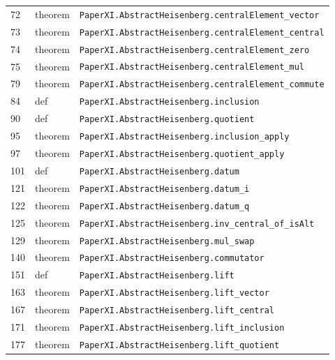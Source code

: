 \documentclass[10pt,oneside]{book}
\begin{document}
\begin{longtable}{@{}p{}p{}p{}@{}}
72&theorem&\nolinkurl{PaperXI.AbstractHeisenberg.centralElement_vector}\\

73&theorem&\nolinkurl{PaperXI.AbstractHeisenberg.centralElement_central}\\

74&theorem&\nolinkurl{PaperXI.AbstractHeisenberg.centralElement_zero}\\

75&theorem&\nolinkurl{PaperXI.AbstractHeisenberg.centralElement_mul}\\

79&theorem&\nolinkurl{PaperXI.AbstractHeisenberg.centralElement_commute}\\

84&def&\nolinkurl{PaperXI.AbstractHeisenberg.inclusion}\\

90&def&\nolinkurl{PaperXI.AbstractHeisenberg.quotient}\\

95&theorem&\nolinkurl{PaperXI.AbstractHeisenberg.inclusion_apply}\\

97&theorem&\nolinkurl{PaperXI.AbstractHeisenberg.quotient_apply}\\

101&def&\nolinkurl{PaperXI.AbstractHeisenberg.datum}\\

121&theorem&\nolinkurl{PaperXI.AbstractHeisenberg.datum_i}\\

122&theorem&\nolinkurl{PaperXI.AbstractHeisenberg.datum_q}\\

125&theorem&\nolinkurl{PaperXI.AbstractHeisenberg.inv_central_of_isAlt}\\

129&theorem&\nolinkurl{PaperXI.AbstractHeisenberg.mul_swap}\\

140&theorem&\nolinkurl{PaperXI.AbstractHeisenberg.commutator}\\

151&def&\nolinkurl{PaperXI.AbstractHeisenberg.lift}\\

163&theorem&\nolinkurl{PaperXI.AbstractHeisenberg.lift_vector}\\

167&theorem&\nolinkurl{PaperXI.AbstractHeisenberg.lift_central}\\

171&theorem&\nolinkurl{PaperXI.AbstractHeisenberg.lift_inclusion}\\

177&theorem&\nolinkurl{PaperXI.AbstractHeisenberg.lift_quotient}\\

\bottomrule\end{longtable}
\end{document}
